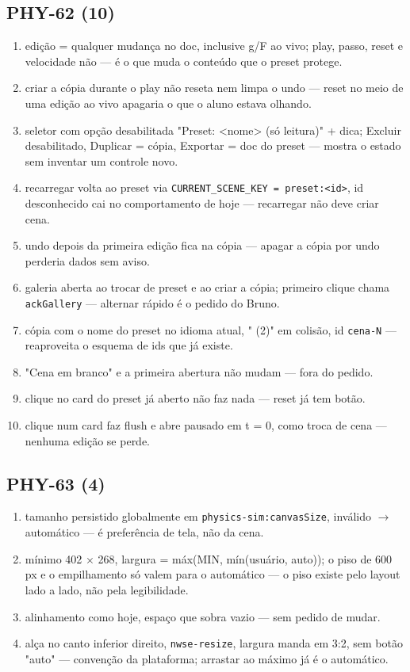 \documentclass[11pt,a4paper]{article}
\begin{document}
{\subsection*{PHY-62 (10)}
\begin{enumerate}
  \item edição = qualquer mudança no doc, inclusive g/F ao vivo; play, passo, reset e velocidade não --- é o que muda o conteúdo que o preset protege.
  \item criar a cópia durante o play não reseta nem limpa o undo --- reset no meio de uma edição ao vivo apagaria o que o aluno estava olhando.
  \item seletor com opção desabilitada "Preset: <nome> (só leitura)" + dica; Excluir desabilitado, Duplicar = cópia, Exportar = doc do preset --- mostra o estado sem inventar um controle novo.
  \item recarregar volta ao preset via \texttt{CURRENT\_SCENE\_KEY = preset:<id>}, id desconhecido cai no comportamento de hoje --- recarregar não deve criar cena.
  \item undo depois da primeira edição fica na cópia --- apagar a cópia por undo perderia dados sem aviso.
  \item galeria aberta ao trocar de preset e ao criar a cópia; primeiro clique chama \texttt{ackGallery} --- alternar rápido é o pedido do Bruno.
  \item cópia com o nome do preset no idioma atual, " (2)" em colisão, id \texttt{cena-N} --- reaproveita o esquema de ids que já existe.
  \item "Cena em branco" e a primeira abertura não mudam --- fora do pedido.
  \item clique no card do preset já aberto não faz nada --- reset já tem botão.
  \item clique num card faz flush e abre pausado em t = 0, como troca de cena --- nenhuma edição se perde.
\end{enumerate}
\subsection*{PHY-63 (4)}
\begin{enumerate}
  \item tamanho persistido globalmente em \texttt{physics-sim:canvasSize}, inválido $\to$ automático --- é preferência de tela, não da cena.
  \item mínimo 402 $\times$ 268, largura = máx(MIN, mín(usuário, auto)); o piso de 600 px e o empilhamento só valem para o automático --- o piso existe pelo layout lado a lado, não pela legibilidade.
  \item alinhamento como hoje, espaço que sobra vazio --- sem pedido de mudar.
  \item alça no canto inferior direito, \texttt{nwse-resize}, largura manda em 3:2, sem botão "auto" --- convenção da plataforma; arrastar ao máximo já é o automático.
\end{enumerate}
}
\end{document}
